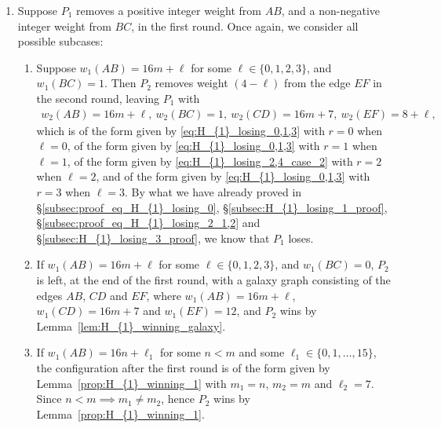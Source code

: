 \documentclass[11pt,reqno]{amsart}
\theoremstyle{definition}
\theoremstyle{definition}
\begin{document}
\begin{enumerate}
\item Suppose $P_{1}$ removes a positive integer weight from $AB$, and a non-negative integer weight from $BC$, in the first round. Once again, we consider all possible subcases:
\begin{enumerate}
\item Suppose $w_{1}(AB)=16m+\ell$ for some $\ell \in \{0,1,2,3\}$, and $w_{1}(BC)=1$. Then $P_{2}$ removes weight $(4-\ell)$ from the edge $EF$ in the second round, leaving $P_{1}$ with
\begin{align}
w_{2}(AB)=16m+\ell,\ w_{2}(BC)=1,\ w_{2}(CD)=16m+7,\ w_{2}(EF)=8+\ell,\nonumber
\end{align}
which is of the form given by \eqref{eq:H_{1}_losing_0,1,3} with $r=0$ when $\ell=0$, of the form given by \eqref{eq:H_{1}_losing_0,1,3} with $r=1$ when $\ell=1$, of the form given by \eqref{eq:H_{1}_losing_2,4_case_2} with $r=2$ when $\ell=2$, and of the form given by \eqref{eq:H_{1}_losing_0,1,3} with $r=3$ when $\ell=3$. By what we have already proved in \S\ref{subsec:proof_eq_H_{1}_losing_0}, \S\ref{subsec:H_{1}_losing_1_proof}, \S\ref{subsec:proof_eq_H_{1}_losing_2_1,2} and \S\ref{subsec:H_{1}_losing_3_proof}, we know that $P_{1}$ loses.

\item If $w_{1}(AB)=16m+\ell$ for some $\ell \in \{0,1,2,3\}$, and $w_{1}(BC)=0$, $P_{2}$ is left, at the end of the first round, with a galaxy graph consisting of the edges $AB$, $CD$ and $EF$, where $w_{1}(AB)=16m+\ell$, $w_{1}(CD)=16m+7$ and $w_{1}(EF)=12$, and $P_{2}$ wins by Lemma~\ref{lem:H_{1}_winning_galaxy}.

\item If $w_{1}(AB)=16n+\ell_{1}$ for some $n < m$ and some $\ell_{1}\in\{0,1,\ldots,15\}$, the configuration after the first round is of the form given by Lemma~\ref{prop:H_{1}_winning_1} with $m_{1}=n$, $m_{2}=m$ and $\ell_{2}=7$. Since $n<m \implies m_{1}\neq m_{2}$, hence $P_{2}$ wins by Lemma~\ref{prop:H_{1}_winning_1}.
\end{enumerate}


\end{enumerate}
\end{document}
